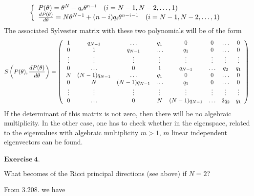\begin{align}
\left \{ \begin{array}{l}
 P(\theta) = \theta^{N} + q_i \theta^{n-i}  \quad (i= N-1,N-2,\dots, 1)\\
 \dv{P(\theta)}{\theta} = N \theta^{N-1} + (n-i)q_i \theta^{n-i-1}  \quad (i= N-1,N-2,\dots, 1)
\end{array} \right.
\end{align}
The associated Sylvester matrix with these two polynomials will be of the form $$ S \left( P(\theta),\dv{P(\theta)}{\theta}\right) = \left( \begin{array}{cccccccc}
 1&q_{N-1}&\dots&q_1&0&0&\dots&0\\
 0&1&q_{N-1}&\dots&q_1&0&\dots&0\\
 \vdots&\vdots&\vdots&\vdots&\vdots&\vdots&\vdots&\vdots\\
 0&\dots&0&1&q_{N-1}&\dots &q_2&q_1\\
 N&(N-1)q_{N-1}&\dots&q_1&0&0&\dots&0\\
 0&N&(N-1)q_{N-1}&\dots&q_1&0&\dots&0\\
 \vdots&\vdots&\vdots&\vdots&\vdots&\vdots&\vdots&\vdots\\
 0&\dots&0&N&(N-1)q_{N-1}&\dots &2q_2&q_1\\
\end{array} \right)
$$
If the determinant of this matrix is not zero, then there will be no algebraic multiplicity. In the other case, one has to check whether in the eigenspace, related to the eigenvalues with algebraic multiplicity $ m > 1$, $m$ linear independent eigenvectors can be found.\\\\
$\mathbf{Exercise \ 4.}$
\begin{tcolorbox}
What becomes of the Ricci principal directions (see above) if $N=2$?
\end{tcolorbox}
From $\mathbf{3.208.}$ we have
